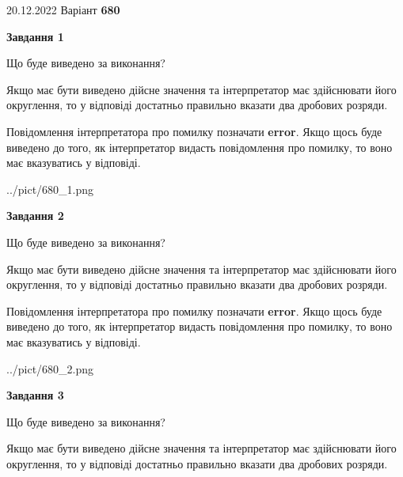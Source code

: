 \documentclass[12pt, ukrainian]{article}
\begin{document}
{20.12.2022 Варіант \No \textbf { 680 }\par}
{
\begin {Large}

{\begin {center}\textbf{Завдання 1}\end {center}}\par
Що буде виведено за виконання? \par

Якщо має бути виведено дійсне значення та інтерпретатор має здійснювати його округлення, 
то у відповіді достатньо правильно вказати два дробових розряди.

Повідомлення інтерпретатора про помилку позначати \textbf{error}.
Якщо щось буде виведено до того, як інтерпретатор видасть повідомлення про помилку, 
то воно має вказуватись у відповіді. \par

\begin{center}
	{../pict/680_1.png}
\end{center}
\newpage

{\begin {center}\textbf{Завдання 2}\end {center}}\par
Що буде виведено за виконання? \par

Якщо має бути виведено дійсне значення та інтерпретатор має здійснювати його округлення, 
то у відповіді достатньо правильно вказати два дробових розряди.

Повідомлення інтерпретатора про помилку позначати \textbf{error}.
Якщо щось буде виведено до того, як інтерпретатор видасть повідомлення про помилку, 
то воно має вказуватись у відповіді. \par

\begin{center}
	{../pict/680_2.png}
\end{center}
\newpage

{\begin {center}\textbf{Завдання 3}\end {center}}\par
Що буде виведено за виконання? \par

Якщо має бути виведено дійсне значення та інтерпретатор має здійснювати його округлення, 
то у відповіді достатньо правильно вказати два дробових розряди.


\end{Large}}
\end{document}

